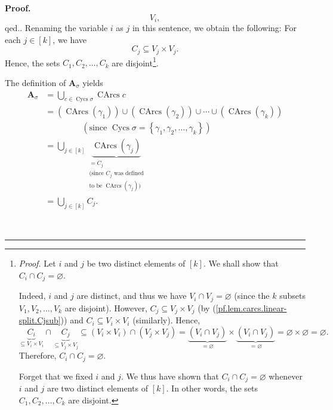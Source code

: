 \documentclass[numbers=enddot,12pt,final,onecolumn,notitlepage]{scrartcl}%
\numberwithin{exer}{section}
\theoremstyle{definition}
\newenvironment{proof}[1][Proof]{\noindent\textbf{#1.} }{\ \rule{0.5em}{0.5em}}
\let\cupnonlimits\bigcup
\renewcommand{\bigcup}{\cupnonlimits\limits}
\newenvironment{verlong}{}{}
\begin{document}
\begin{verlong}
\begin{proof}
{\[V_{i},
\]
qed.}. Renaming the variable $i$ as $j$ in this sentence, we obtain the
following: For each $j\in\left[  k\right]  $, we have%
\begin{equation}
C_{j}\subseteq V_{j}\times V_{j}. \label{pf.lem.carcs.linear-split.Cjsub}%
\end{equation}
Hence, the sets $C_{1},C_{2},\ldots,C_{k}$ are
disjoint\footnote{\textit{Proof.} Let $i$ and $j$ be two distinct elements of
$\left[  k\right]  $. We shall show that $C_{i}\cap C_{j}=\varnothing$.
\par
Indeed, $i$ and $j$ are distinct, and thus we have $V_{i}\cap V_{j}%
=\varnothing$ (since the $k$ subsets $V_{1},V_{2},\ldots,V_{k}$ are disjoint).
However, $C_{j}\subseteq V_{j}\times V_{j}$ (by
(\ref{pf.lem.carcs.linear-split.Cjsub})) and $C_{i}\subseteq V_{i}\times
V_{i}$ (similarly). Hence,%
\[
\underbrace{C_{i}}_{\subseteq V_{i}\times V_{i}}\cap\underbrace{C_{j}%
}_{\subseteq V_{j}\times V_{j}}\subseteq\left(  V_{i}\times V_{i}\right)
\cap\left(  V_{j}\times V_{j}\right)  =\underbrace{\left(  V_{i}\cap
V_{j}\right)  }_{=\varnothing}\times\underbrace{\left(  V_{i}\cap
V_{j}\right)  }_{=\varnothing}=\varnothing\times\varnothing=\varnothing.
\]
Therefore, $C_{i}\cap C_{j}=\varnothing$.
\par
Forget that we fixed $i$ and $j$. We thus have shown that $C_{i}\cap
C_{j}=\varnothing$ whenever $i$ and $j$ are two distinct elements of $\left[
k\right]  $. In other words, the sets $C_{1},C_{2},\ldots,C_{k}$ are
disjoint.}.

The definition of $\mathbf{A}_{\sigma}$ yields%
\begin{align}
\mathbf{A}_{\sigma}  &  =\bigcup_{c\in\operatorname*{Cycs}\sigma
}\operatorname*{CArcs}c\nonumber\\
&  =\left(  \operatorname*{CArcs}\left(  \gamma_{1}\right)  \right)
\cup\left(  \operatorname*{CArcs}\left(  \gamma_{2}\right)  \right)
\cup\cdots\cup\left(  \operatorname*{CArcs}\left(  \gamma_{k}\right)  \right)
\nonumber\\
&  \ \ \ \ \ \ \ \ \ \ \ \ \ \ \ \ \ \ \ \ \left(  \text{since }%
\operatorname*{Cycs}\sigma=\left\{  \gamma_{1},\gamma_{2},\ldots,\gamma
_{k}\right\}  \right) \nonumber\\
&  =\bigcup_{j\in\left[  k\right]  }\underbrace{\operatorname*{CArcs}\left(
\gamma_{j}\right)  }_{\substack{=C_{j}\\\text{(since }C_{j}\text{ was
defined}\\\text{to be }\operatorname*{CArcs}\left(  \gamma_{j}\right)
\text{)}}}\nonumber\\
&  =\bigcup_{j\in\left[  k\right]  }C_{j}.
\label{pf.lem.carcs.linear-split.Asig=un}%
\end{align}



\end{proof}
\end{verlong}
\end{document}
